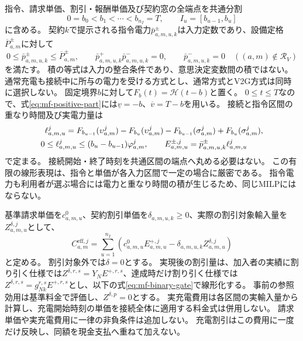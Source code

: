 指令、請求単価、割引・報酬単価及び契約窓の全端点を共通分割
\begin{equation}
 0=b_0<b_1<\cdots<b_{n_I}=T,\qquad I_u=[b_{u-1},b_u]
 \label{eq:mf-dispatch-partition}
\end{equation}
に含める。
契約$k$で提示される指令電力$\bar p_{a,m,u,k}^{\pm}$は入力定数であり、設備定格$\overline P_{a,m}^{\pm}$に対して
\begin{equation}
 0\le\bar p_{a,m,u,k}^{\pm}\le\overline P_{a,m}^{\pm},\qquad
 \bar p_{a,m,u,k}^{+}\bar p_{a,m,u,k}^{-}=0,\qquad
 \bar p_{a,m,u,k}^{-}=0\quad((a,m)\notin\mathcal R_V)
 \label{eq:mf-dispatch-input}
\end{equation}
を満たす。
積の等式は入力の整合条件であり、意思決定変数間の積ではない。
通常充電も接続中に所与の電力を受ける方式とし、通常方式とV2G方式は同時に選択しない。
固定境界$b$に対して$F_b(t)=\mathcal H(t-b)$と置く。
$0\le t\le T$なので、式\eqref{eq:mf-positive-part}には$\underline v=-b$、$\overline v=T-b$を用いる。
接続と指令区間の重なり時間及び実電力量は
\begin{align}
 \ell_{a,m,u}^j={}&F_{b_{u-1}}(\upsilon_{a,m}^j)-F_{b_u}(\upsilon_{a,m}^j)
 -F_{b_{u-1}}(\sigma_{a,m}^j)+F_{b_u}(\sigma_{a,m}^j),\notag\\
 0\le\ell_{a,m,u}^j&\le(b_u-b_{u-1})\varphi_{a,m}^j,\qquad
 E_{a,m,u}^{\pm,j}=\bar p_{a,m,u,k}^{\pm}\ell_{a,m,u}^j
 \label{eq:mf-overlap-energy}
\end{align}
で定まる。
接続開始・終了時刻を共通区間の端点へ丸める必要はない。
この有限の線形表現は、指令と単価が各入力区間で一定の場合に厳密である。
指令電力も利用者が選ぶ場合には電力と重なり時間の積が生じるため、同じMILPにはならない。

基準請求単価を$c_{a,m,u}^{0}$、契約割引単価を$\delta_{a,m,u,k}\ge0$、実際の割引対象輸入量を$Z_{a,m,u}^{\delta,j}$として、
\begin{equation}
 C_{a,m}^{\mathrm{eff},j}
 =\sum_{u=1}^{n_I}
 \left(c_{a,m,u}^{0}E_{a,m,u}^{+,j}
       -\delta_{a,m,u,k}Z_{a,m,u}^{\delta,j}\right)
 \label{eq:mf-electricity-bill}
\end{equation}
と定める。
割引対象外では$\delta=0$とする。
実現後の割引量は、加入者の実績に割り引く仕様では$Z^{\delta,r,s}=Y_NE^{+,r,s}$、達成時だけ割り引く仕様では$Z^{\delta,r,s}=g_{Nk}^{r,s}E^{+,r,s}$とし、以下の式\eqref{eq:mf-binary-gate}で線形化する。
事前の参照効用は基準料金で評価し、$Z^{\delta,p}=0$とする。
実充電費用は各区間の実輸入量から計算し、充電開始時刻の単価を接続全体に適用する料金式は併用しない。
請求単価や実充電費用に一律の非負条件は追加しない。
充電割引はこの費用に一度だけ反映し、同額を現金支払へ重ねて加えない。

